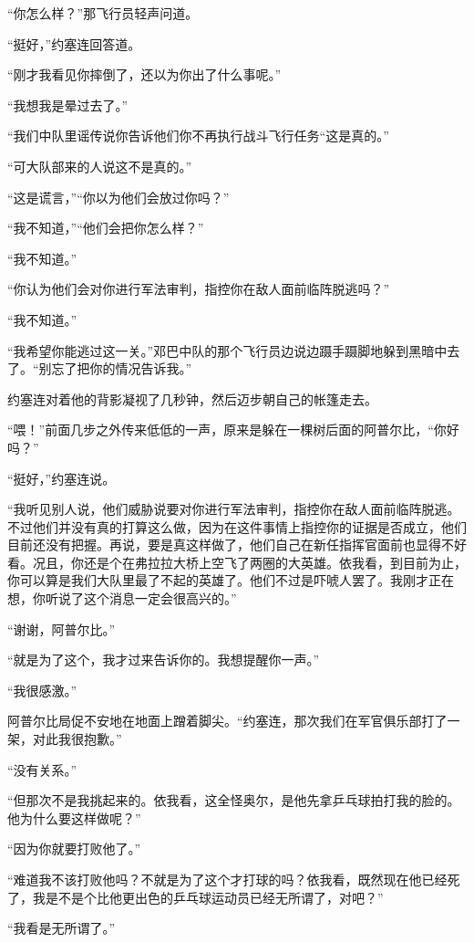     “你怎么样？”那飞行员轻声问道。

    “挺好，”约塞连回答道。

    “刚才我看见你摔倒了，还以为你出了什么事呢。”

    “我想我是晕过去了。”

    “我们中队里谣传说你告诉他们你不再执行战斗飞行任务“这是真的。”

    “可大队部来的人说这不是真的。”

    “这是谎言，”“你以为他们会放过你吗？”

    “我不知道，”“他们会把你怎么样？”

    “我不知道。”

    “你认为他们会对你进行军法审判，指控你在敌人面前临阵脱逃吗？”

    “我不知道。”

    “我希望你能逃过这一关。”邓巴中队的那个飞行员边说边蹑手蹑脚地躲到黑暗中去了。“别忘了把你的情况告诉我。”

    约塞连对着他的背影凝视了几秒钟，然后迈步朝自己的帐篷走去。

    “喂！”前面几步之外传来低低的一声，原来是躲在一棵树后面的阿普尔比，“你好吗？”

    “挺好，”约塞连说。

    “我听见别人说，他们威胁说要对你进行军法审判，指控你在敌人面前临阵脱逃。不过他们并没有真的打算这么做，因为在这件事情上指控你的证据是否成立，他们目前还没有把握。再说，要是真这样做了，他们自己在新任指挥官面前也显得不好看。况且，你还是个在弗拉拉大桥上空飞了两圈的大英雄。依我看，到目前为止，你可以算是我们大队里最了不起的英雄了。他们不过是吓唬人罢了。我刚才正在想，你听说了这个消息一定会很高兴的。”

    “谢谢，阿普尔比。”

    “就是为了这个，我才过来告诉你的。我想提醒你一声。”

    “我很感激。”

    阿普尔比局促不安地在地面上蹭着脚尖。“约塞连，那次我们在军官俱乐部打了一架，对此我很抱歉。”

    “没有关系。”

    “但那次不是我挑起来的。依我看，这全怪奥尔，是他先拿乒乓球拍打我的脸的。他为什么要这样做呢？”

    “因为你就要打败他了。”

    “难道我不该打败他吗？不就是为了这个才打球的吗？依我看，既然现在他已经死了，我是不是个比他更出色的乒乓球运动员已经无所谓了，对吧？”

    “我看是无所谓了。”

